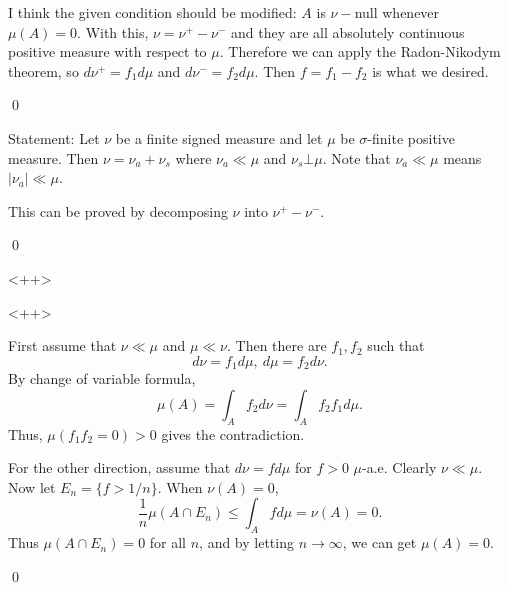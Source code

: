 \begin{problem}[13.1] \hfill

	I think the given condition should be modified: $A$ is $\nu-$null whenever $\mu(A) = 0$.
	With this, $\nu = \nu^+ - \nu^-$ and they are all absolutely continuous positive measure with respect to $\mu$.
	Therefore we can apply the Radon-Nikodym theorem, so $d\nu^+ = f_1 d\mu$ and $d\nu^- = f_2 d\mu$.
	Then $f = f_1 - f_2$ is what we desired.

	\qed
\end{problem}

\begin{problem}[13.2] \hfill

	Statement: Let $\nu$ be a finite signed measure and let $\mu$ be $\sigma$-finite positive measure.
	Then $\nu = \nu_a + \nu_s$ where $\nu_a \ll \mu$ and $\nu_s \bot \mu$.
	Note that $\nu_a \ll \mu$ means $|\nu_a| \ll \mu$.

	This can be proved by decomposing $\nu$ into $\nu^+ - \nu^-$.
	
	\qed
\end{problem}

\begin{problem}[13.3]\hfill
	
\end{problem}<++>

\begin{problem}[13.4]\hfill
	
\end{problem}<++>

\begin{problem}[13.5]\hfill

	First assume that $\nu \ll \mu$ and $\mu \ll \nu$.
	Then there are $f_1, f_2$ such that
	\[
		d\nu = f_1d\mu, \ d\mu = f_2 d\nu.
	\]
	By change of variable formula,
	\[
		\mu(A) = \int_A f_2 d\nu = \int_A f_2 f_1 d\mu.
	\]
	Thus, $\mu(f_1 f_2 = 0) >0$ gives the contradiction.

	For the other direction, assume that $d\nu = fd\mu$ for $f>0$ $\mu$-a.e.
	Clearly $\nu \ll \mu$.
	Now let $E_n = \{ f > 1/n \}$.
	When $\nu(A) = 0$,
	\[
		\frac{1}{n}\mu(A\cap E_n) \leq \int_{A} f d\mu = \nu(A) = 0.
	\]
	Thus $\mu(A\cap E_n) = 0$ for all $n$, and by letting $n\rightarrow \infty$, we can get $\mu(A) = 0$.

	\qed
\end{problem}


